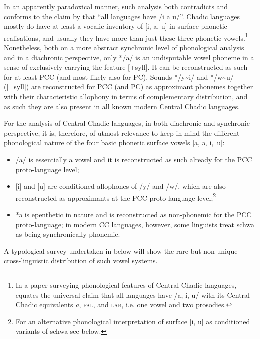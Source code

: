 \documentclass[output=paper]{langscibook}
\begin{document}
\largerpage
In an apparently paradoxical manner, such analysis both contradicts and conforms to the claim by \citet[115]{Crothers1978} that “all languages have /i a u/”. Chadic languages mostly do have at least a vocalic inventory of [i, a, u] in surface phonetic realisations, and usually they have more than just these three phonetic vowels.\footnote{In a paper surveying phonological features of Central Chadic languages, \citet{Roberts2001} equates the universal claim that all languages have /a, i, u/ with its Central Chadic equivalents \textit{a}, \textsc{pal}, and \textsc{lab}, i.e. one vowel and two prosodies.} Nonetheless, both on a more abstract synchronic level of phonological analysis and in a diachronic perspective, only */a/ is an undisputable vowel phoneme in a sense of exclusively carrying the feature [+syll]. It can be reconstructed as such for at least PCC (and most likely also for PC). Sounds */y{\textasciitilde}i/ and */w{\textasciitilde}u/ ([±syll]) are reconstructed for PCC (and PC) as approximant phonemes together with their characteristic allophony in terms of complementary distribution, and as such they are also present in all known modern Central Chadic languages.

For the analysis of Central Chadic languages, in both diachronic and synchronic perspective, it is, therefore, of utmost relevance to keep in mind the different phonological nature of the four basic phonetic surface vowels [a, ə, i,~u]: 

\begin{itemize}
\item /a/ is essentially a vowel and it is reconstructed as such already for the PCC proto-language level; 
\item{} [i] and [u] are conditioned allophones of /y/ and /w/, which are also reconstructed as approximants at the PCC proto-language level;\footnote{For an alternative phonological interpretation of surface [i, u] as conditioned variants of schwa see below.} 
\item *ə is epenthetic in nature and is reconstructed as non-phonemic for the PCC proto-language; in modern CC languages, however, some linguists treat schwa as being synchronically phonemic. 
\end{itemize}

A typological survey undertaken in  below will show the rare but non-unique cross-linguistic distribution of such vowel systems.
\end{document}
